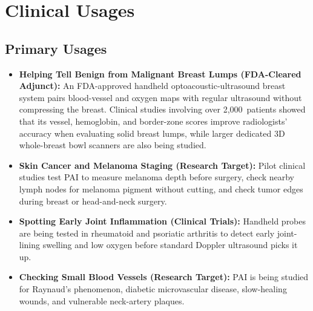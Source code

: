 \section{Clinical Usages}

\subsection{Primary Usages}
\begin{itemize}
  \item \textbf{Helping Tell Benign from Malignant Breast Lumps (FDA-Cleared Adjunct):} An FDA-approved handheld optoacoustic-ultrasound breast system pairs blood-vessel and oxygen maps with regular ultrasound without compressing the breast. Clinical studies involving over 2,000~patients showed that its vessel, hemoglobin, and border-zone scores improve radiologists' accuracy when evaluating solid breast lumps, while larger dedicated 3D whole-breast bowl scanners are also being studied.
  \item \textbf{Skin Cancer and Melanoma Staging (Research Target):} Pilot clinical studies test PAI to measure melanoma depth before surgery, check nearby lymph nodes for melanoma pigment without cutting, and check tumor edges during breast or head-and-neck surgery.
  \item \textbf{Spotting Early Joint Inflammation (Clinical Trials):} Handheld probes are being tested in rheumatoid and psoriatic arthritis to detect early joint-lining swelling and low oxygen before standard Doppler ultrasound picks it up.
  \item \textbf{Checking Small Blood Vessels (Research Target):} PAI is being studied for Raynaud's phenomenon, diabetic microvascular disease, slow-healing wounds, and vulnerable neck-artery plaques.
\end{itemize}

